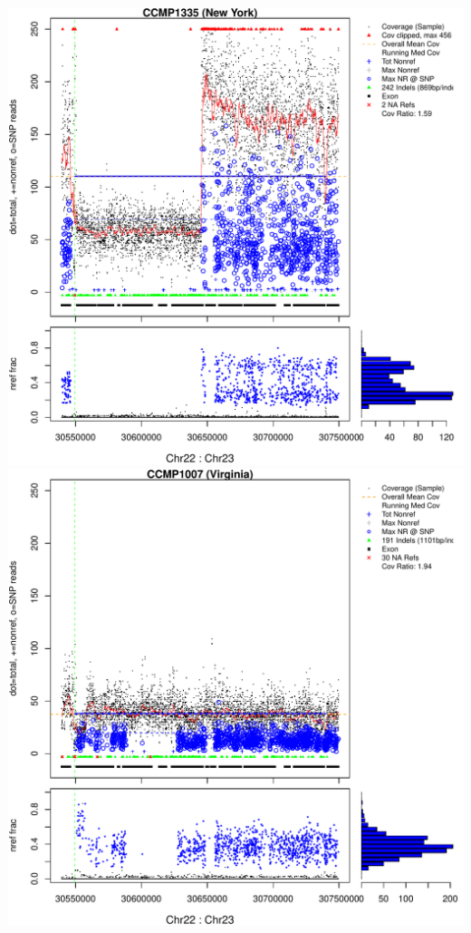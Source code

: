 \documentclass{article}\usepackage[]{graphicx}\usepackage[]{color}
\makeatletter
\def\maxwidth{ %
  \ifdim\Gin@nat@width>\linewidth
    \linewidth
  \else
    \Gin@nat@width
  \fi
}
\newenvironment{knitrout}{}{} %
\makeatother
\begin{document}
\begin{knitrout}
{\centering \includegraphics[width=\maxwidth]{figs-knitr/unnamed-chunk-41-1} 
\includegraphics[width=\maxwidth]{figs-knitr/unnamed-chunk-41-2} 
}
\end{knitrout}
\end{document}
